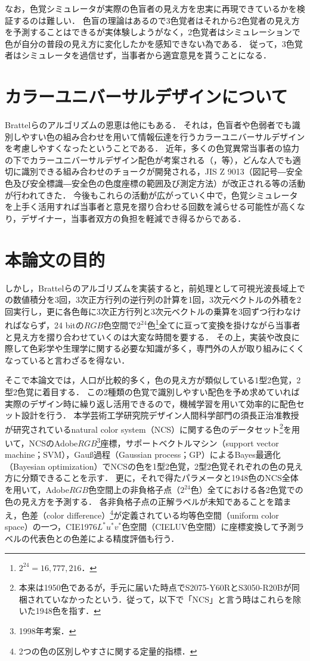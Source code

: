 \documentclass[uplatex,paper=a4,fontsize=4.0truemm,jafontsize=4.0truemm,head_space=30.0truemm,foot_space=30.0truemm,baselineskip=8.0truemm,line_length=40zw,gutter=25.0truemm,oneside,openany,fleqn,hanging_panctuation,open_bracket_pos=nibu_tentsuki,dvipdfmx,jis2004,book,titlepage]{jlreq}
\theoremstyle{mystyle}
\newcommand{\mathdisplaystyle}[1]{\(\displaystyle{#1}\)}
\begin{document}
			なお，色覚シミュレータが実際の色盲者の見え方を忠実に再現できているかを検証するのは難しい．
			色盲の理論はあるので3色覚者はそれから2色覚者の見え方を予測することはできるが実体験しようがなく，2色覚者はシミュレーションで色が自分の普段の見え方に変化したかを感知できない為である．
			従って，3色覚者はシミュレータを過信せず，当事者から適宜意見を貰うことになる．
		\section{カラーユニバーサルデザインについて}
			Brattelらのアルゴリズムの恩恵は他にもある．
			それは，色盲者や色弱者でも識別しやすい色の組み合わせを用いて情報伝達を行うカラーユニバーサルデザインを考慮しやすくなったということである．
			近年，多くの色覚異常当事者の協力の下でカラーユニバーサルデザイン配色が考案される（\cite[pp.~1091--1099]{Okabe2002c}，\cite{cudo2018}等），どんな人でも適切に識別できる組み合わせのチョークが開発される\cite{Rikagaku2020}，JIS Z 9013（図記号―安全色及び安全標識―安全色の色度座標の範囲及び測定方法）が改正される\cite{Nakano2018}等の活動が行われてきた．
			今後もこれらの活動が広がっていく中で，色覚シミュレータを上手く活用すれば当事者と意見を摺り合わせる回数を減らせる可能性が高くなり，デザイナー，当事者双方の負担を軽減でき得るからである．
		\section{本論文の目的}
			しかし，Brattelらのアルゴリズムを実装すると，前処理として可視光波長域上での数値積分を3回，3次正方行列の逆行列の計算を1回，3次元ベクトルの外積を2回実行し，更に各色毎に3次正方行列と3次元ベクトルの乗算を3回ずつ行わなければならず，24 bitの\mathdisplaystyle{RGB}色空間で\mathdisplaystyle{2^{24}}色\footnote{\mathdisplaystyle{2^{24}=16{,}777{,}216}．}全てに亘って変換を掛けながら当事者と見え方を摺り合わせていくのは大変な時間を要する．
			その上，実装や改良に際して色彩学や生理学に関する必要な知識が多く，専門外の人が取り組みにくくなっていると言わざるを得ない．

			そこで本論文では，人口が比較的多く，色の見え方が類似している1型2色覚，2型2色覚に着目する．
			この2種類の色覚で識別しやすい配色を予め求めていれば実際のデザイン時に繰り返し活用できるので，機械学習を用いて効率的に配色セット設計を行う．
			本学芸術工学研究院デザイン人間科学部門の須長正治准教授が研究されているnatural color system（NCS）に関する色のデータセット\footnote{本来は1950色であるが，手元に届いた時点でS2075-Y60RとS3050-R20Bが同梱されていなかったという．従って，以下で「NCS」と言う時はこれらを除いた1948色を指す．}を用いて，NCSのAdobe\mathdisplaystyle{RGB}\footnote{1998年考案．}座標，サポートベクトルマシン（support vector machine；SVM），Gauß過程（Gaussian process；GP）によるBayes最適化（Bayesian optimization）でNCSの色を1型2色覚，2型2色覚それぞれの色の見え方に分類できることを示す．
			更に，それで得たパラメータと1948色のNCS全体を用いて，Adobe\mathdisplaystyle{RGB}色空間上の非負格子点（\mathdisplaystyle{2^{24}}色）全てにおける各2色覚での色の見え方を予測する．
			各非負格子点の正解ラベルが未知であることを踏まえ，色差（color difference）\footnote{2つの色の区別しやすさに関する定量的指標．}が定義されている均等色空間（uniform color space）の一つ，CIE1976\mathdisplaystyle{L^\ast u^\ast v^\ast}色空間（CIELUV色空間）\cite[p.~64]{Yaguchi2017b}に座標変換して予測ラベルの代表色との色差による精度評価も行う．
\end{document}
